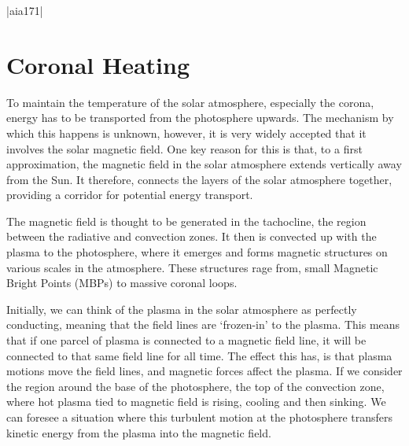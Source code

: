 \py[chapter1]|aia171|

\section{Coronal Heating}

To maintain the temperature of the solar atmosphere, especially the corona, energy has to be transported from the photosphere upwards.
The mechanism by which this happens is unknown, however, it is very widely accepted that it involves the solar magnetic field.
One key reason for this is that, to a first approximation, the magnetic field in the solar atmosphere extends vertically away from the Sun.
It therefore, connects the layers of the solar atmosphere together, providing a corridor for potential energy transport.

The magnetic field is thought to be generated in the tachocline, the region between the radiative and convection zones.
It then is convected up with the plasma to the photosphere, where it emerges and forms magnetic structures on various scales in the atmosphere.
These structures rage from, small Magnetic Bright Points (MBPs) to massive coronal loops.

Initially, we can think of the plasma in the solar atmosphere as perfectly conducting, meaning that the field lines are `frozen-in' to the plasma.
This means that if one parcel of plasma is connected to a magnetic field line, it will be connected to that same field line for all time.
The effect this has, is that plasma motions move the field lines, and magnetic forces affect the plasma.
If we consider the region around the base of the photosphere, the top of the convection zone, where hot plasma tied to magnetic field is rising, cooling and then sinking.
We can foresee a situation where this turbulent motion at the photosphere transfers kinetic energy from the plasma into the magnetic field.

